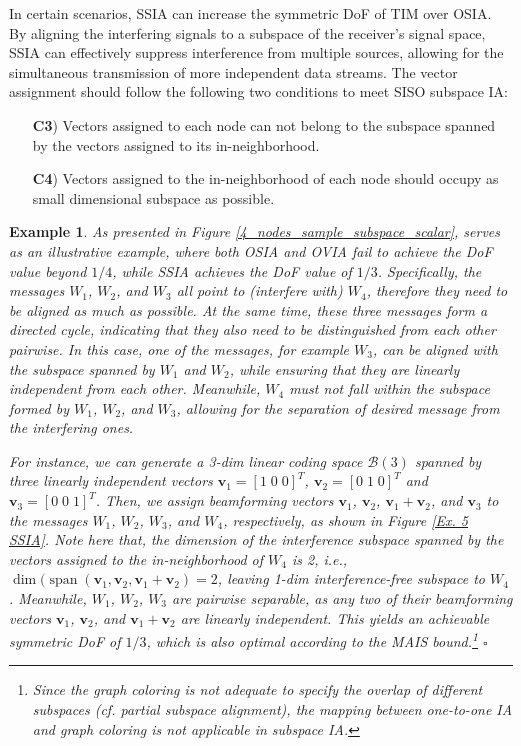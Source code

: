 \documentclass[a4paper,journal]{IEEEtran}
\def\v {\mathbf{v}}
\newtheorem{exe}{Example}
\begin{document}
In certain scenarios, SSIA can increase the symmetric DoF of TIM over OSIA. 
By aligning the interfering signals to a subspace of the receiver's signal space, SSIA can effectively suppress interference from multiple sources, allowing for the simultaneous transmission of more independent data streams. The vector assignment should follow the following two conditions to meet SISO subspace IA:
\begin{itemize}
    \item [\textbf{C3})] Vectors assigned to each node can not belong to the subspace spanned by the vectors assigned to its in-neighborhood.
    \item [\textbf{C4})] Vectors assigned to the in-neighborhood of each node should occupy as small dimensional subspace as possible. 
\end{itemize}
\begin{exe} \label{Ex_SVIA}
As presented in Figure \ref{4_nodes_sample_subspace_scalar}, serves as an illustrative example, where both OSIA and OVIA fail to achieve the DoF value beyond $1/4$, while SSIA achieves the DoF value of $1/3$. Specifically, the messages $W_{1}$, $W_{2}$, and $W_{3}$ all point to (interfere with) $W_{4}$, therefore they need to be aligned as much as possible. At the same time, these three messages form a directed cycle, indicating that they also need to be distinguished from each other pairwise. In this case, one of the messages, for example $W_{3}$, can be aligned with the subspace spanned by $W_{1}$ and $W_{2}$, while ensuring that they are linearly independent from each other. Meanwhile, $W_{4}$ must not fall within the subspace formed by $W_{1}$, $W_{2}$, and $W_{3}$, allowing for the separation of desired message from the interfering ones.

For instance, we can generate a 3-dim linear coding space $\mathcal{B}(3)$ spanned by three linearly independent vectors $\v_1=[1 \; 0\; 0]^T$, $\v_2=[0 \; 1\; 0]^T$ and $\v_3=[0 \; 0 \; 1]^T$. Then, we assign beamforming vectors $\v_1$, $\v_2$, $\v_1+\v_2$, and $\v_3$ to the messages $W_{1}$, $W_{2}$, $W_{3}$, and $W_{4}$, respectively, as shown in Figure \ref{Ex. 5 SSIA}. Note here that, the dimension of the interference subspace spanned by the vectors assigned to the in-neighborhood of $W_{4}$ is 2, i.e., $\dim(\operatorname{span}(\v_1, \v_2, \v_1+\v_2) = 2$, leaving 1-dim interference-free subspace to $W_{4}$. Meanwhile, $W_{1}$, $W_{2}$, $W_{3}$ are pairwise separable, as any two of their beamforming vectors $\v_1$, $\v_2$, and $\v_1+\v_2$ are linearly independent. This yields an achievable symmetric DoF of $1/3$, which is also optimal according to the MAIS bound.\footnote{Since the graph coloring is not adequate to specify the overlap of different subspaces (cf. partial subspace alignment), the mapping between one-to-one IA and graph coloring is not applicable in subspace IA. }   \hfill $\square$ 
\end{exe}
\end{document}
